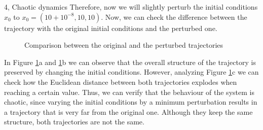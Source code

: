 \begin{task}{4, Chaotic dynamics}
Therefore, now we will slightly perturb the initial conditions \(x_0\) to \(x_0 = (10 + 10^{-8}, 10, 10)\). Now, we can check the difference between the trajectory with the original initial conditions and the perturbed one.
\begin{figure}[H]
\centering
{}
\caption{Comparison between the original and the perturbed trajectories}
\label{lorenzcomparison}
\end{figure}

In Figure \ref{lorenzcomparison}a and \ref{lorenzcomparison}b we can observe that the overall structure of the trajectory is preserved by changing the initial conditions. However, analyzing Figure \ref{lorenzcomparison}c we can check how the Euclidean distance between both trajectories explodes when reaching a certain value. Thus, we can verify that the behaviour of the system is chaotic, since varying the initial conditions by a minimum perturbation results in a trajectory that is very far from the original one. Although they keep the same structure, both trajectories are not the same. 


\end{task}
